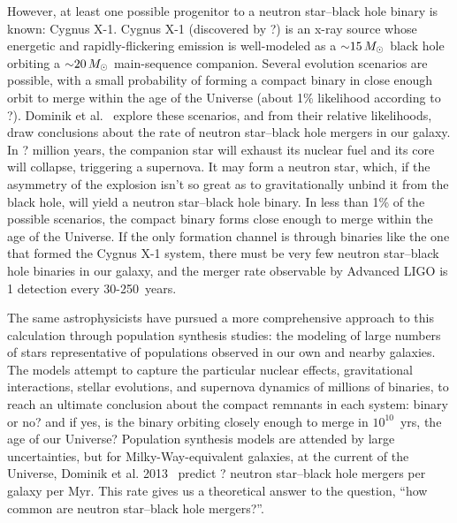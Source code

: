 However, at least one possible progenitor to a neutron star--black hole \nsbh
binary is known: Cygnus X-1. Cygnus X-1 (discovered by ?)
is an x-ray source whose energetic and rapidly-flickering emission
is well-modeled as a $\mathord{\sim}15\,M_\odot$ black hole orbiting a $\mathord{\sim}20\,M_\odot$
main-sequence companion.
Several evolution scenarios are possible, with a small probability of forming
a compact binary in close enough orbit to merge within the age of the Universe
(about 1\% likelihood according to ?).
Dominik et al.\
explore these scenarios, and from their relative likelihoods, draw conclusions
about the rate of neutron star--black hole \nsbh mergers in our galaxy.
In ? million years,
the companion star will exhaust its nuclear fuel and its core will collapse,
triggering a supernova. It may form a neutron star, which, if the asymmetry of
the explosion isn't so great as to gravitationally unbind it from the black hole,
will yield a neutron star--black hole \nsbh binary. In less than 1\% of the possible
scenarios, the compact binary forms close enough to merge within the age of the
Universe. If the only formation channel is through
binaries like the one that formed the Cygnus X-1 system, there must be very few
neutron star--black hole \nsbh binaries in our galaxy, and the merger rate observable
by Advanced LIGO is 1 detection every 30-250~years.

The same astrophysicists have pursued a more comprehensive approach to this
calculation through population synthesis studies: the modeling of large numbers
of stars representative of populations observed in our own and nearby galaxies.
The models attempt to capture the particular nuclear effects, gravitational
interactions, stellar evolutions, and supernova dynamics of millions of binaries,
to reach an ultimate conclusion about the compact remnants in each system:
binary or no? and if yes, is the binary orbiting closely enough to merge in
$10^{10}$~yrs, the age of our Universe?
Population synthesis models are attended by large uncertainties,
but for Milky-Way-equivalent galaxies, at the current of the Universe,
Dominik et al. 2013\
\todo{fix cite}
predict ? neutron star--black hole \nsbh mergers per galaxy per Myr.
This rate gives us a theoretical answer to the question, ``how common are
neutron star--black hole mergers?''.

